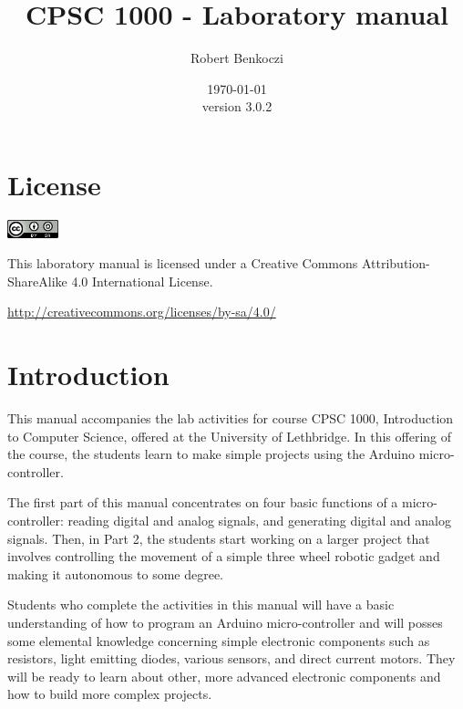 \documentclass[12pt]{book}
\title{CPSC 1000 - Laboratory manual}    %
\author{Robert Benkoczi}              %
\date{\today\\ version 3.0.2}  %
\begin{document}
\frontmatter                            %
\maketitle                              %
\tableofcontents                        %

\chapter{License}


\includegraphics[width=4em]{by-sa.png}

\noindent
This laboratory manual is licensed under a Creative Commons
Attribution-ShareAlike 4.0 International License.

\noindent
\url{http://creativecommons.org/licenses/by-sa/4.0/}

\chapter{Introduction}

This manual accompanies the lab activities for course CPSC 1000,
Introduction to Computer Science, offered at the University of
Lethbridge. In this offering of the course, the students learn to
make simple projects using the Arduino micro-controller. 

The first part of this manual concentrates on four basic functions of
a micro-controller: reading digital and analog signals, and generating
digital and analog signals. Then, in Part 2, the students start
working on a larger project that involves controlling the movement of
a simple three wheel robotic gadget and making it autonomous to some
degree.

Students who complete the activities in this manual will have a basic
understanding of how to program an Arduino micro-controller and will
posses some elemental knowledge concerning simple electronic
components such as resistors, light emitting diodes, various sensors,
and direct current motors. They will be ready to learn about other, more
advanced electronic components and how to build more complex projects.
\end{document}
